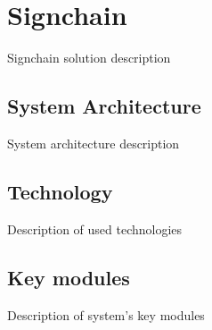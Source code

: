 \newpage
\section{Signchain}
Signchain solution description

\subsection{System Architecture}
System architecture description

\subsection{Technology}
Description of used technologies

\subsection{Key modules}
Description of system's key modules